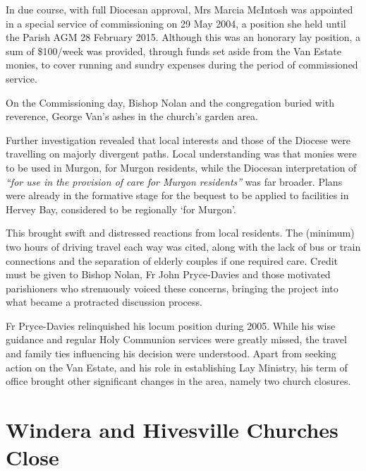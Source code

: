 In due course, with full Diocesan approval, Mrs Marcia McIntosh was appointed in a special service of commissioning on 29 May 2004, a position she held until the Parish AGM 28 February 2015. Although this was an honorary lay position, a sum of \$100/week was provided, through funds set aside from the Van Estate monies, to cover running and sundry expenses during the period of commissioned service.



On the Commissioning day, Bishop Nolan and the congregation buried with reverence, George Van's ashes in the church's garden area.



Further investigation revealed that local interests and those of the Diocese were travelling on majorly divergent paths. Local understanding was that monies were to be used in Murgon, for Murgon residents, while the Diocesan interpretation of \emph{``for use in the provision of care for Murgon residents''} was far broader. Plans were already in the formative stage for the bequest to be applied to facilities in Hervey Bay, considered to be regionally `for Murgon'.



This brought swift and distressed reactions from local residents. The (minimum) two hours of driving travel each way was cited, along with the lack of bus or train connections and the separation of elderly couples if one required care. Credit must be given to Bishop Nolan, Fr John Pryce-Davies and those motivated parishioners who strenuously voiced these concerns, bringing the project into what became a protracted discussion process.



Fr Pryce-Davies relinquished his locum position during 2005. While his wise guidance and regular Holy Communion services were greatly missed, the travel and family ties influencing his decision were understood. Apart from seeking action on the Van Estate, and his role in establishing Lay Ministry, his term of office brought other significant changes in the area, namely two church closures.



\section{Windera and Hivesville Churches Close}



